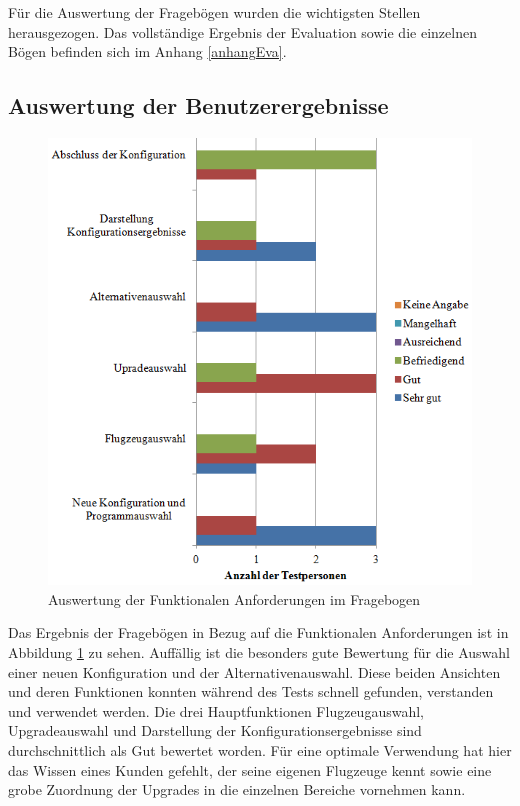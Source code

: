 Für die Auswertung der Fragebögen wurden die wichtigsten Stellen herausgezogen. Das vollständige Ergebnis der Evaluation sowie die einzelnen Bögen befinden sich im Anhang \ref{anhangEva}.


\subsection{Auswertung der Benutzerergebnisse}
\begin{figure}[H]
\centering
\includegraphics[width=\hsize]{images/bewertung_tablet}
\caption{Auswertung der Funktionalen Anforderungen im Fragebogen}
\label{bewertungTablet}
\end{figure}
Das Ergebnis der Fragebögen in Bezug auf die Funktionalen Anforderungen ist in Abbildung \ref{bewertungTablet} zu sehen. Auffällig ist die besonders gute Bewertung für die Auswahl einer neuen Konfiguration und der Alternativenauswahl. Diese beiden Ansichten und deren Funktionen konnten während des Tests schnell gefunden, verstanden und verwendet werden. Die drei Hauptfunktionen Flugzeugauswahl, Upgradeauswahl und Darstellung der Konfigurationsergebnisse sind durchschnittlich als Gut bewertet worden. Für eine optimale Verwendung hat hier das Wissen eines Kunden gefehlt, der seine eigenen Flugzeuge kennt sowie eine grobe Zuordnung der Upgrades in die einzelnen Bereiche vornehmen kann. \par

